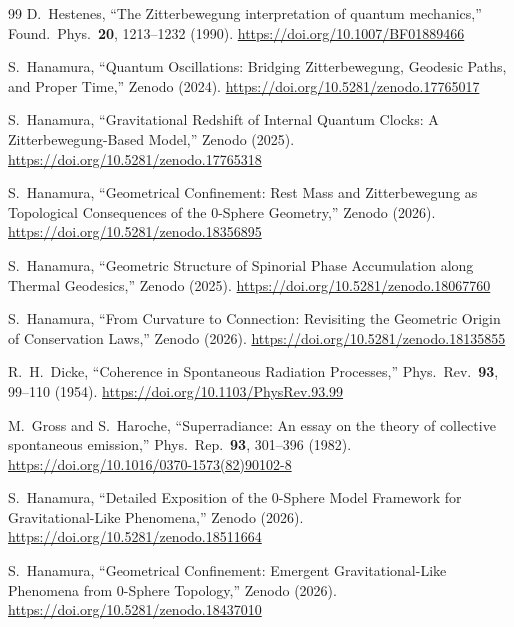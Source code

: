 \documentclass[12pt,a4paper]{article}
\begin{document}
\begin{thebibliography}{99}
D.~Hestenes,
``The Zitterbewegung interpretation of quantum mechanics,''
Found.\ Phys.\ \textbf{20}, 1213--1232 (1990).
\href{https://doi.org/10.1007/BF01889466}{https://doi.org/10.1007/BF01889466}

S.~Hanamura,
``Quantum Oscillations: Bridging Zitterbewegung, Geodesic Paths, and Proper Time,''
Zenodo (2024).
\href{https://doi.org/10.5281/zenodo.17765017}{https://doi.org/10.5281/zenodo.17765017}

S.~Hanamura,
``Gravitational Redshift of Internal Quantum Clocks: A Zitterbewegung-Based Model,''
Zenodo (2025).
\href{https://doi.org/10.5281/zenodo.17765318}{https://doi.org/10.5281/zenodo.17765318}

S.~Hanamura,
``Geometrical Confinement: Rest Mass and Zitterbewegung as Topological Consequences of the 0-Sphere Geometry,''
Zenodo (2026).
\href{https://doi.org/10.5281/zenodo.18356895}{https://doi.org/10.5281/zenodo.18356895}

S.~Hanamura,
``Geometric Structure of Spinorial Phase Accumulation along Thermal Geodesics,''
Zenodo (2025).
\href{https://doi.org/10.5281/zenodo.18067760}{https://doi.org/10.5281/zenodo.18067760}

S.~Hanamura,
``From Curvature to Connection: Revisiting the Geometric Origin of Conservation Laws,''
Zenodo (2026).
\href{https://doi.org/10.5281/zenodo.18135855}{https://doi.org/10.5281/zenodo.18135855}

R.~H.~Dicke,
``Coherence in Spontaneous Radiation Processes,''
Phys.\ Rev.\ \textbf{93}, 99--110 (1954).
\href{https://doi.org/10.1103/PhysRev.93.99}{https://doi.org/10.1103/PhysRev.93.99}

M.~Gross and S.~Haroche,
``Superradiance: An essay on the theory of collective spontaneous emission,''
Phys.\ Rep.\ \textbf{93}, 301--396 (1982).
\href{https://doi.org/10.1016/0370-1573(82)90102-8}{https://doi.org/10.1016/0370-1573(82)90102-8}

S.~Hanamura,
``Detailed Exposition of the 0-Sphere Model Framework for Gravitational-Like Phenomena,''
Zenodo (2026).
\href{https://doi.org/10.5281/zenodo.18511664}{https://doi.org/10.5281/zenodo.18511664}

S.~Hanamura,
``Geometrical Confinement: Emergent Gravitational-Like Phenomena from 0-Sphere Topology,''
Zenodo (2026).
\href{https://doi.org/10.5281/zenodo.18437010}{https://doi.org/10.5281/zenodo.18437010}


\end{thebibliography}
\end{document}
